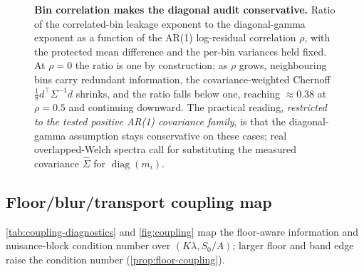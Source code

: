 \documentclass[11pt]{article}
\begin{document}
\begin{figure}[htbp]
\centering
\centering
{}

\caption{\textbf{Bin correlation makes the diagonal audit conservative.} Ratio of the correlated-bin leakage exponent to the diagonal-gamma exponent as a function of the AR(1) log-residual correlation \(\rho\), with the protected mean difference and the per-bin variances held fixed. At \(\rho=0\) the ratio is one by construction; as \(\rho\) grows, neighbouring bins carry redundant information, the covariance-weighted Chernoff \(\tfrac18 d^\top\Sigma^{-1}d\) shrinks, and the ratio falls below one, reaching \(\approx0.38\) at \(\rho=0.5\) and continuing downward. The practical reading, \emph{restricted to the tested positive AR(1) covariance family}, is that the diagonal-gamma assumption stays conservative on these cases; real overlapped-Welch spectra call for substituting the measured covariance \(\widehat\Sigma\) for \(\operatorname{diag}(m_i)\).}
\label{fig:covariance}
\end{figure}

\subsection{Floor/blur/transport coupling map}

\cref{tab:coupling-diagnostics} and \cref{fig:coupling} map the floor-aware information and nuisance-block condition number over \((K\lambda,S_0/A)\); larger floor and band edge raise the condition number (\cref{prop:floor-coupling}).
\end{document}
